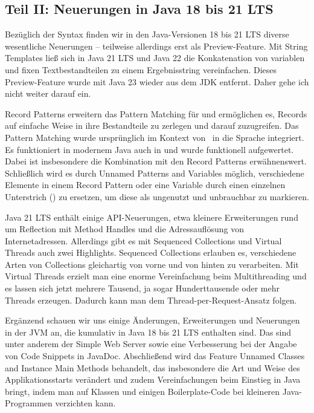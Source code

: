 \subsection{Teil II: Neuerungen in Java 18 bis 21 LTS}


Bezüglich der Syntax finden wir in den Java-Versionen 18 bis 21 LTS
diverse  wesentliche Neuerungen -- teilweise
allerdings erst als Preview-Feature. Mit String Templates ließ sich in Java 21 LTS und
Java 22 die Konkatenation von  variablen und fixen Textbestandteilen zu einem Ergebnisstring vereinfachen.
 Dieses Preview-Feature wurde mit Java 23 wieder aus dem JDK entfernt. Daher gehe
 ich nicht weiter darauf ein.

Record Patterns erweitern das Pattern Matching für  und
ermöglichen es, Records auf ein\-fache Weise  in ihre Bestandteile zu zerlegen und darauf
zuzugreifen. Das Pattern Matching wurde ursprünglich im Kontext von
 \ in die Sprache integriert. Es funktioniert in modernem Java
 auch in  und wurde funktionell aufgewertet.
Dabei ist insbesondere die Kombination mit den Record Patterns erwähnenswert.
 Schließlich wird es durch Unnamed Patterns and Variables möglich,
verschiedene Elemente in einem Record Pattern oder eine Variable durch
einen einzelnen Unterstrich (\frqq\code{\_}\flqq{}) zu ersetzen, um diese als ungenutzt und unbrauchbar zu markieren.


Java 21 LTS enthält einige API-Neuerungen, etwa kleinere
Erweiterungen rund um Reflection mit Method Handles und die Adressauflösung von
Internetadressen. Allerdings gibt es mit Sequenced Collections und
Virtual Threads auch zwei Highlights. Sequenced Collections erlauben es,
verschiedene Arten von Collections gleichartig von vorne und von hinten zu verarbeiten.
Mit Virtual Threads erzielt man eine enorme Vereinfachung beim Multithreading und es lassen sich
 jetzt mehrere Tausend, ja sogar Hunderttausende oder mehr
Threads erzeugen. Dadurch kann man dem Thread-per-Request-Ansatz folgen.


Ergänzend schauen wir uns einige Änderungen, Erweiterungen und Neuerungen in der JVM an,
die kumulativ in Java 18 bis 21 LTS enthalten sind. Das sind unter anderem der
 Simple Web Server sowie eine Verbesserung bei der Angabe von
  Code Snippets in JavaDoc. Abschließend wird das Feature
   Unnamed Classes and Instance Main Methods behandelt, das insbesondere die Art und Weise
   des Applikationsstarts verändert und zudem Vereinfachungen beim Einstieg in
   Java bringt, indem man auf Klassen und einigen Boilerplate-Code bei
   kleineren Java-Programmen verzichten kann.




